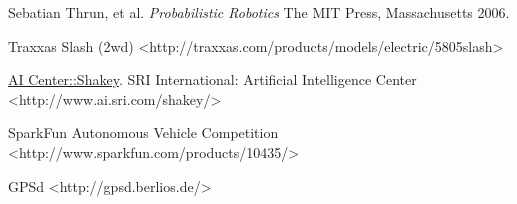 \begin{thebibliography}{9}

   Sebatian Thrun, et al.
   \emph{Probabilistic Robotics}
   The MIT Press, Massachusetts
   2006.

   Traxxas Slash (2wd)
   \textless{}http://traxxas.com/products/models/electric/5805slash\textgreater

   \uline{AI Center::Shakey}. SRI International: Artificial Intelligence Center
   \textless{}http://www.ai.sri.com/shakey/\textgreater

   SparkFun Autonomous Vehicle Competition
   \textless{}http://www.sparkfun.com/products/10435/\textgreater

   GPSd
   \textless{}http://gpsd.berlios.de/\textgreater

\end{thebibliography}
